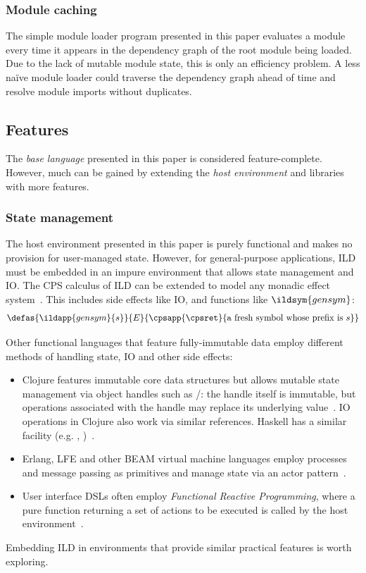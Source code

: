 \subsubsection{Module caching}
The simple module loader program presented in this paper evaluates a module every
time it appears in the dependency graph of the root module being loaded.
Due to the lack of mutable module state, this is only an efficiency problem. A less
naïve module loader could traverse the dependency graph ahead of time and
resolve module imports without duplicates.
\subsection{Features}
The \emph{base language} presented in this paper is considered feature-complete. However,
much can be gained by extending the \emph{host environment} and libraries with
more features.
\subsubsection{State management}
\label{side-effects}
The host environment presented in this paper is purely functional and makes no
provision for user-managed state. However, for general-purpose applications,
ILD must be embedded in an impure environment that allows state management and
IO. The CPS calculus of ILD can be extended to model any monadic effect system~\cite[Section 3.3]{wadler}. This includes side effects like IO, and functions
like \(\ildsym{gensym}\):%
\[
\defas{\ildapp{gensym}{s}}{E}{\cpsapp{\cpsret}{\text{a fresh symbol whose
prefix is } s}}
\]

Other functional languages that feature fully-immutable data employ different
methods of handling state, IO and other side effects:
\begin{itemize}
    \item Clojure features immutable core data structures but allows mutable
    state management via object handles such as /:
    the handle itself is immutable, but operations associated with the handle
    may replace its underlying value~\cite{clojure-hist,clojure-atoms}.
    IO operations in Clojure
    also work via similar references. Haskell has a similar
    facility (e.g. , )~\cite{tackling-awkward-squad}.
    \item Erlang, LFE and other BEAM virtual machine languages employ
    processes and message passing as primitives and manage state via an
    actor pattern~\cite{erlang,hewitt-actors}.
    \item User interface DSLs often employ \emph{Functional Reactive Programming},
    where a pure function returning a set of actions to be executed is called by the host
    environment~\cite{hudak-frp,elm-async-frp}.
\end{itemize}
Embedding ILD in environments that provide similar practical features is worth exploring.

